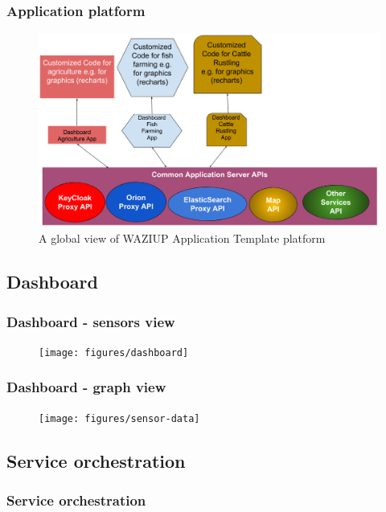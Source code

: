 \documentclass{beamer}
\begin{document}
\begin{frame}
\frametitle{Application platform}

  \begin{figure}[H]  
  \centering  
  \includegraphics[width=.68\linewidth]{figures/AppArchitecture.png}   
  \caption{A global view of WAZIUP Application Template platform}
  \label{fig-app}
  \end{figure}
 
\end{frame}

\subsection{Dashboard}

\begin{frame}
\frametitle{Dashboard - sensors view}

  \begin{figure}[H]  
  \centering  
  \texttt{[image: figures/dashboard]} 
  \label{fig-dashboard}
  \end{figure}

\end{frame}
  
\begin{frame}
\frametitle{Dashboard - graph view}

\vspace{-1cm}
  \begin{figure} 
  \centering  
  \texttt{[image: figures/sensor-data]}
  \label{fig-sensor-data}
  \end{figure}
 
\end{frame}

\subsection{Service orchestration}


\begin{frame}
\frametitle{Service orchestration}

\end{frame}
\end{document}
